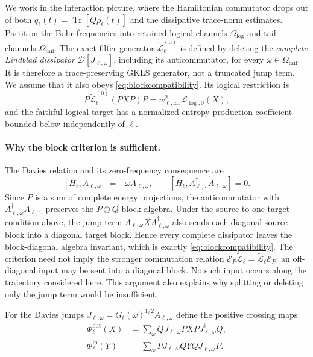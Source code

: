 \documentclass[11pt,a4paper]{article}
\theoremstyle{remark}
\newcommand{\D}{\mathcal D}
\newcommand{\cL}{\mathcal L}
\DeclareMathOperator{\Tr}{Tr}
\begin{document}
We work in the interaction picture, where the Hamiltonian commutator drops out of both $q_\ell(t)=\Tr[Q\rho_\ell(t)]$ and the dissipative trace-norm estimates.  Partition the Bohr frequencies into retained logical channels $\Omega_{\log}$ and tail channels $\Omega_{\mathrm{tail}}$.  The exact-filter generator $\widetilde{\cL}_\ell^{(0)}$ is defined by deleting the \emph{complete Lindblad dissipator} $\D[J_{\ell,\omega}]$, including its anticommutator, for every $\omega\in\Omega_{\mathrm{tail}}$.  It is therefore a trace-preserving GKLS generator, not a truncated jump term.  We assume that it also obeys \eqref{eq:blockcompatibility}.  Its logical restriction is
\[
 P\widetilde{\cL}_\ell^{(0)}(PXP)P
 =w_{\ell,\mathrm{far}}^2\cL_{\log,0}(X),
\]
and the faithful logical target has a normalized entropy-production coefficient bounded below independently of $\ell$.

\paragraph{Why the block criterion is sufficient.}
The Davies relation and its zero-frequency consequence are
\[
 [H_\ell,A_{\ell,\omega}]=-\omega A_{\ell,\omega},
 \qquad
 [H_\ell,A_{\ell,\omega}^\dagger A_{\ell,\omega}]=0.
\]
Since $P$ is a sum of complete energy projections, the anticommutator with $A_{\ell,\omega}^\dagger A_{\ell,\omega}$ preserves the $P\oplus Q$ block algebra.  Under the source-to-one-target condition above, the jump term $A_{\ell,\omega}XA_{\ell,\omega}^\dagger$ also sends each diagonal source block into a diagonal target block.  Hence every complete dissipator leaves the block-diagonal algebra invariant, which is exactly \eqref{eq:blockcompatibility}.  The criterion need not imply the stronger commutation relation $\mathcal E_P\widetilde{\cL}_\ell=\widetilde{\cL}_\ell\mathcal E_P$: an off-diagonal input may be sent into a diagonal block.  No such input occurs along the trajectory considered here.  This argument also explains why splitting or deleting only the jump term would be insufficient.

For the Davies jumps $J_{\ell,\omega}=G_\ell(\omega)^{1/2}A_{\ell,\omega}$ define the positive crossing maps
\begin{align}
 \Phi_\ell^{\mathrm{out}}(X)
 &=\sum_\omega QJ_{\ell,\omega}PXPJ_{\ell,\omega}^\dagger Q,\\
 \Phi_\ell^{\mathrm{in}}(Y)
 &=\sum_\omega PJ_{\ell,\omega}QYQJ_{\ell,\omega}^\dagger P.
\end{align}
\end{document}
